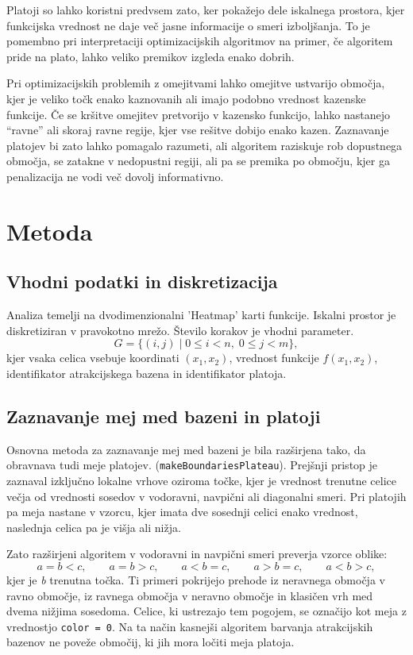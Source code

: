 \documentclass[12pt,a4paper]{article}
\begin{document}
    Platoji so lahko koristni predvsem zato, ker pokažejo dele iskalnega prostora, kjer funkcijska vrednost ne daje več jasne informacije o smeri izboljšanja. To je pomembno pri interpretaciji optimizacijskih algoritmov na primer, če algoritem pride na plato, lahko veliko premikov izgleda enako dobrih.
    
    Pri optimizacijskih problemih z omejitvami lahko omejitve ustvarijo območja, kjer je veliko točk enako kaznovanih ali imajo podobno vrednost kazenske funkcije. Če se kršitve omejitev pretvorijo v kazensko funkcijo, lahko nastanejo “ravne” ali skoraj ravne regije, kjer vse rešitve dobijo enako kazen. Zaznavanje platojev bi zato lahko pomagalo razumeti, ali algoritem raziskuje rob dopustnega območja, se zatakne v nedopustni regiji, ali pa se premika po območju, kjer ga penalizacija ne vodi več dovolj informativno.
    
    \section{Metoda}
    
    \subsection{Vhodni podatki in diskretizacija}
    
    Analiza temelji na dvodimenzionalni 'Heatmap' karti funkcije. Iskalni prostor je diskretiziran v pravokotno mrežo. Število korakov je vhodni parameter. 
    \[
    G = \{(i,j) \mid 0 \le i < n,\; 0 \le j < m\},
    \]
    kjer vsaka celica vsebuje koordinati \((x_1,x_2)\), vrednost funkcije \(f(x_1,x_2)\), identifikator atrakcijskega bazena in identifikator platoja. 
    
    \subsection{Zaznavanje mej med bazeni in platoji}
    
    Osnovna metoda za zaznavanje mej med bazeni je bila razširjena tako, da obravnava tudi meje platojev. (\texttt{makeBoundariesPlateau}). Prejšnji pristop je zaznaval izključno lokalne vrhove oziroma točke, kjer je vrednost trenutne celice večja od vrednosti sosedov v vodoravni, navpični ali diagonalni smeri. Pri platojih pa meja nastane v vzorcu, kjer imata dve sosednji celici enako vrednost, naslednja celica pa je višja ali nižja.
    
    Zato razširjeni algoritem v vodoravni in navpični smeri preverja vzorce oblike:
    \[
    a = b < c,\qquad a = b > c,\qquad a < b = c,\qquad a > b = c,\qquad a < b > c,
    \]
    kjer je \textit{b} trenutna točka.
    Ti primeri pokrijejo prehode iz neravnega območja v ravno območje, iz ravnega območja v neravno območje in klasičen vrh med dvema nižjima sosedoma. Celice, ki ustrezajo tem pogojem, se označijo kot meja z vrednostjo \texttt{color = 0}. Na ta način kasnejši algoritem barvanja atrakcijskih bazenov ne poveže območij, ki jih mora ločiti meja platoja.
    
\end{document}
